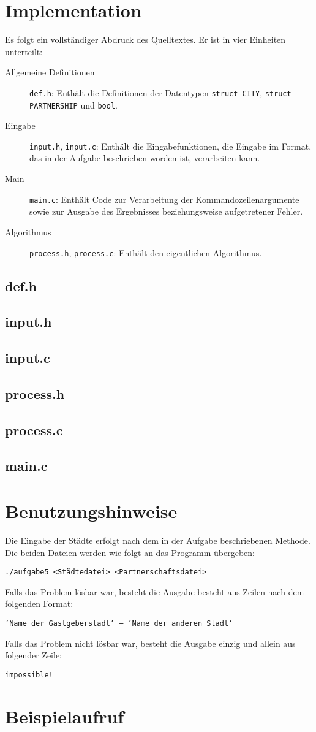 \documentclass{scrartcl}
\newcommand{\listSec}[1]{
	\subsection*{#1}
	
}
\begin{document}
\section{Implementation}
Es folgt ein vollständiger Abdruck des Quelltextes. Er ist in vier Einheiten unterteilt:

\begin{description}
\item[Allgemeine Definitionen] \texttt{def.h}: Enthält die Definitionen der Datentypen \texttt{struct CITY}, \texttt{struct PARTNERSHIP} und \texttt{bool}.
\item[Eingabe] \texttt{input.h}, \texttt{input.c}: Enthält die Eingabefunktionen, die Eingabe im Format, das in der Aufgabe beschrieben worden ist, verarbeiten kann.
\item[Main] \texttt{main.c}: Enthält Code zur Verarbeitung der Kommandozeilenargumente sowie zur Ausgabe des Ergebnisses beziehungsweise aufgetretener Fehler.
\item[Algorithmus] \texttt{process.h}, \texttt{process.c}: Enthält den eigentlichen Algorithmus.
\end{description}

\listSec{def.h}
\listSec{input.h}
\listSec{input.c}
\listSec{process.h}
\listSec{process.c}
\listSec{main.c}

\section{Benutzungshinweise}
Die Eingabe der Städte erfolgt nach dem in der Aufgabe beschriebenen Methode. Die beiden Dateien werden wie folgt an das Programm übergeben:

\texttt{./aufgabe5 <Städtedatei> <Partnerschaftsdatei>}

Falls das Problem lösbar war, besteht die Ausgabe besteht aus Zeilen nach dem folgenden Format:

\texttt{'Name der Gastgeberstadt'\ -- 'Name der anderen Stadt'}

Falls das Problem nicht lösbar war, besteht die Ausgabe einzig und allein aus folgender Zeile:

\texttt{impossible!}

\section{Beispielaufruf}
\end{document}
